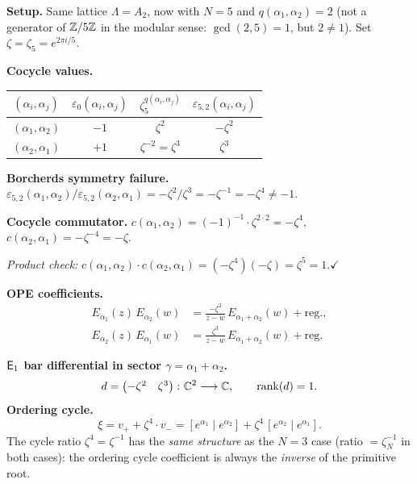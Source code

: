 \begin{computation}[\texorpdfstring{$A_2$}{A_2} with non-standard parameter: \texorpdfstring{$N = 5$}{N = 5}, \texorpdfstring{$q = 2$}{q = 2}]
\label{comp:lattice:a2-n5-q2}

\noindent\textbf{Setup.}
Same lattice $\Lambda = A_2$, now with $N = 5$ and
$q(\alpha_1,\alpha_2) = 2$ (not a generator of $\mathbb{Z}/5\mathbb{Z}$
in the modular sense: $\gcd(2,5) = 1$, but $2 \neq 1$).
Set $\zeta = \zeta_5 = e^{2\pi i/5}$.
\smallskip

\noindent\textbf{Cocycle values.}
\begin{center}
\renewcommand{\arraystretch}{1.3}
\begin{tabular}{c c c c}
$(\alpha_i,\alpha_j)$
  & $\varepsilon_0(\alpha_i,\alpha_j)$
  & $\zeta_5^{q(\alpha_i,\alpha_j)}$
  & $\varepsilon_{5,2}(\alpha_i,\alpha_j)$ \\
\hline
$(\alpha_1,\alpha_2)$
  & $-1$ & $\zeta^2$ & $-\zeta^2$ \\
$(\alpha_2,\alpha_1)$
  & $+1$ & $\zeta^{-2} = \zeta^3$ & $\zeta^3$
\end{tabular}
\end{center}
\smallskip

\noindent\textbf{Borcherds symmetry failure.}
$\varepsilon_{5,2}(\alpha_1,\alpha_2)/\varepsilon_{5,2}(\alpha_2,\alpha_1)
= -\zeta^2/\zeta^3 = -\zeta^{-1} = -\zeta^4 \neq -1$.
\smallskip

\noindent\textbf{Cocycle commutator.}
$c(\alpha_1,\alpha_2) = (-1)^{-1} \cdot \zeta^{2 \cdot 2} = -\zeta^4$,\quad
$c(\alpha_2,\alpha_1) = -\zeta^{-4} = -\zeta$.

\noindent\emph{Product check:}
$c(\alpha_1,\alpha_2) \cdot c(\alpha_2,\alpha_1)
= (-\zeta^4)(-\zeta) = \zeta^5 = 1$.\;$\checkmark$
\smallskip

\noindent\textbf{OPE coefficients.}
\begin{align*}
E_{\alpha_1}(z)\, E_{\alpha_2}(w)
&= \frac{-\zeta^2}{z - w}\,E_{\alpha_1+\alpha_2}(w) + \mathrm{reg.}, \\
E_{\alpha_2}(z)\, E_{\alpha_1}(w)
&= \frac{\zeta^3}{z - w}\,E_{\alpha_1+\alpha_2}(w) + \mathrm{reg.}
\end{align*}
\smallskip

\noindent\textbf{$\mathsf{E}_1$ bar differential in sector $\gamma = \alpha_1 + \alpha_2$.}
\[
d =
\begin{pmatrix} -\zeta^2 & \zeta^3 \end{pmatrix}
\colon \mathbb{C}^2 \longrightarrow \mathbb{C}, \qquad
\operatorname{rank}(d) = 1.
\]
\textbf{Ordering cycle.}
\begin{equation}\label{eq:lattice:a2-n5-cycle}
\xi = v_+ + \zeta^4 \cdot v_-
= [e^{\alpha_1} \mid e^{\alpha_2}]
  + \zeta^4\,[e^{\alpha_2} \mid e^{\alpha_1}].
\end{equation}
The cycle ratio $\zeta^4 = \zeta^{-1}$ has the \emph{same structure}
as the $N = 3$ case (ratio $= \zeta_N^{-1}$ in both cases): the
ordering cycle coefficient is always the
\emph{inverse} of the primitive root.


\end{computation}
